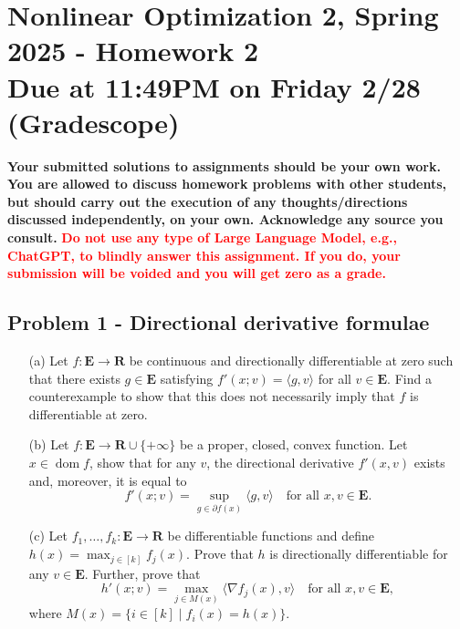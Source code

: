 \documentclass[11pt]{article}
\date{}
\title{}
\newcommand{\RR}{\mathbf{R}}
\newcommand{\EEE}{\mathbf{E}}
\newcommand{\dom}{\operatorname{dom}}
\begin{document}
\section*{\textbf{Nonlinear Optimization 2, Spring 2025 - Homework 2} \\ Due at 11:49PM on Friday 2/28 (Gradescope)}
\label{sec:orgecd51a6}
\textbf{Your submitted solutions to assignments should be your own work. You are allowed to discuss homework problems with other students, but should carry out the execution of any thoughts/directions discussed independently, on your own. Acknowledge any source you consult.}
\textbf{\textcolor{red}{Do not use any type of Large Language Model, e.g., ChatGPT, to blindly answer this assignment. If you do, your submission will be voided and you will get zero as a grade.}} \vspace{.5cm}
\subsection*{Problem 1 - Directional derivative formulae}
\label{sec:org6fd4b70}
\begin{itemize}
\item[(a)] Let $f \colon \EEE \rightarrow \RR$ be continuous and directionally differentiable at zero such that there exists $g\in \EEE$ satisfying  $f'(x; v) = \langle g, v \rangle$ for all $v \in \EEE$. Find a counterexample to show that this does not necessarily imply that $f$ is differentiable at zero.
\item[(b)] Let $f \colon \EEE \rightarrow \RR \cup \{+ \infty\}$ be a proper, closed, convex function. Let $x \in \dom f$, show that for any $v$, the directional derivative $f'(x, v)$ exists and, moreover, it is equal to $$ f'(x; v) = \sup_{g \in \partial f(x)} \langle g, v\rangle \quad \text{for all }x, v \in \EEE.$$
\item[(c)] Let $f_{1}, \dots, f_{k} \colon \EEE \rightarrow \RR$ be differentiable functions and define $h(x) = \max_{j \in [k]} f_{j}(x)$. Prove that $h$ is directionally differentiable for any $v \in \EEE.$ Further, prove that
$$
h'(x; v) = \max_{j \in M(x)} \langle \nabla f_{j}(x), v\rangle \quad \text{for all }x, v \in \EEE,
$$
where $M(x) = \{i \in [k] \mid f_{i}(x) = h(x)\}$.
\end{itemize}
\end{document}
